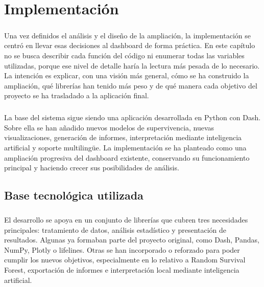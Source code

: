\chapter{Implementación}

\paragraph*{}
Una vez definidos el análisis y el diseño de la ampliación, la implementación se centró en llevar esas decisiones al dashboard de forma práctica. En este capítulo no se busca describir cada función del código ni enumerar todas las variables utilizadas, porque ese nivel de detalle haría la lectura más pesada de lo necesario. La intención es explicar, con una visión más general, cómo se ha construido la ampliación, qué librerías han tenido más peso y de qué manera cada objetivo del proyecto se ha trasladado a la aplicación final.

\paragraph*{}
La base del sistema sigue siendo una aplicación desarrollada en Python con Dash. Sobre ella se han añadido nuevos modelos de supervivencia, nuevas visualizaciones, generación de informes, interpretación mediante inteligencia artificial y soporte multilingüe. La implementación se ha planteado como una ampliación progresiva del dashboard existente, conservando su funcionamiento principal y haciendo crecer sus posibilidades de análisis.

\section{Base tecnológica utilizada}

\paragraph*{}
El desarrollo se apoya en un conjunto de librerías que cubren tres necesidades principales: tratamiento de datos, análisis estadístico y presentación de resultados. Algunas ya formaban parte del proyecto original, como Dash, Pandas, NumPy, Plotly o lifelines. Otras se han incorporado o reforzado para poder cumplir los nuevos objetivos, especialmente en lo relativo a Random Survival Forest, exportación de informes e interpretación local mediante inteligencia artificial.


